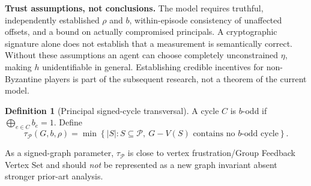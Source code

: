 \documentclass[10pt,a4paper]{article}
\theoremstyle{definition}\newtheorem{definition}[theorem]{Definition}
\newcommand{\Princ}{\mathcal P}
\begin{document}
\textbf{Trust assumptions, not conclusions.} The model requires truthful, independently established $\rho$ and $b$, within-episode consistency of unaffected offsets, and a bound on actually compromised principals. A cryptographic signature alone does not establish that a measurement is semantically correct. Without these assumptions an agent can choose completely unconstrained $\eta$, making $h$ unidentifiable in general. Establishing credible incentives for non-Byzantine players is part of the subsequent research, not a theorem of the current model.

\begin{definition}[Principal signed-cycle transversal]\label{def:tau}
A cycle $C$ is $b$-odd if $\bigoplus_{e\in C}b_e=1$. Define
\begin{equation}\label{eq:tau}
 \tau_{\Princ}(G,b,\rho)=\min\left\{|S|:S\subseteq\Princ,\ \text{$G-V(S)$ contains no $b$-odd cycle}\right\}.
\end{equation}
\end{definition}
As a signed-graph parameter, $\tau_{\Princ}$ is close to vertex frustration/Group Feedback Vertex Set and should \emph{not} be represented as a new graph invariant absent stronger prior-art analysis.
\end{document}
